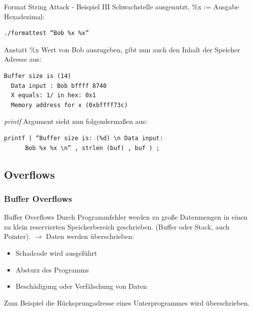 \documentclass[10pt]{beamer}
\begin{document}
\begin{frame}[fragile]{Format String Attack - Beispiel III}
  Schwachstelle ausgenutzt, \%x := Ausgabe Hexadezimal:
  \begin{lstlisting}[style=BashStyle]
  ./formattest “Bob %x %x”
  \end{lstlisting}

  Anstatt \%x Wert von Bob auszugeben, gibt nun auch den Inhalt der Speicher Adresse aus:
  \begin{lstlisting}[style=BashStyle]
  Buffer size is (14)
  Data input : Bob bffff 8740
  X equals: 1/ in hex: 0x1
  Memory address for x (0xbffff73c)
  \end{lstlisting}

  \textit{printf} Argument sieht nun folgenderma{\ss}en aus:
  \begin{lstlisting}[style=CStyle]
  printf ( “Buffer size is: (%d) \n Data input:
      Bob %x %x \n” , strlen (buf) , buf ) ;
  \end{lstlisting}
\end{frame}


\subsection{Overflows}

\subsubsection{Buffer Overflows}

\begin{frame}[fragile]{Buffer Overflows}
  Durch Programmfehler werden zu gro{\ss}e Datenmengen in einen zu klein reservierten Speicherbereich geschrieben.
  (Buffer oder Stack, auch Pointer).
  \newline
  \newline
  $\rightarrow$ Daten werden \"uberschrieben:
  \begin{itemize}
    \item Schadcode wird ausgef\"uhrt
    \item Absturz des Programms
    \item Besch\"adigung oder Verf\"alschung von Daten
  \end{itemize}
  Zum Beispiel die R\"ucksprungadresse eines Unterprogrammes wird \"uberschrieben.
\end{frame}
\end{document}
